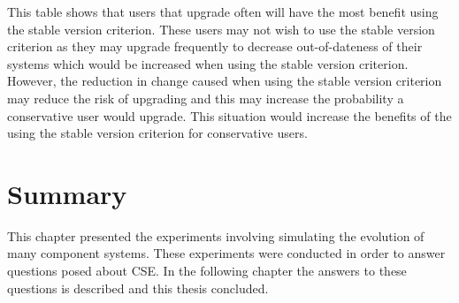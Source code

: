 This table shows that users that upgrade often will have the most benefit using the stable version criterion.
These users may not wish to use the stable version criterion as they may upgrade frequently to decrease out-of-dateness of their systems
which would be increased when using the stable version criterion.
However, the reduction in change caused when using the stable version criterion may reduce the risk of upgrading 
and this may increase the probability a conservative user would upgrade.
This situation would increase the benefits of the using the stable version criterion for conservative users.

\section{Summary}
This chapter presented the experiments involving simulating the evolution of many component systems.
These experiments were conducted in order to answer questions posed about CSE.
In the following chapter the answers to these questions is described and this thesis concluded.



